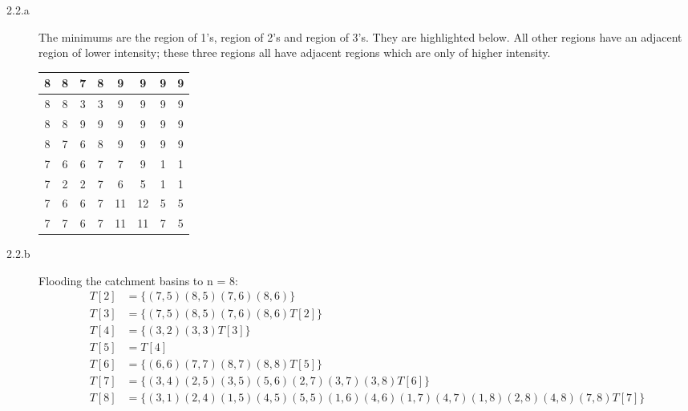\documentclass[fleqn]{article}
\begin{document}
\begin{description}
\item [2.2.a]
    The minimums are the region of 1's, region of 2's and region of 3's. They
        are highlighted below. All other regions have an adjacent region of
        lower intensity; these three regions all have adjacent regions which are
        only of higher intensity.

    \begin{tabular}{| c | c | c | c | c | c | c | c |}
        \hline
        8 & 8 & 7 & 8 & 9 & 9 & 9 & 9 \\ \hline
        8 & 8 & \cellcolor{green} 3 & \cellcolor{green} 3 & 9 & 9 & 9 & 9 \\ \hline
        8 & 8 & 9 & 9 & 9 & 9 & 9 & 9 \\ \hline
        8 & 7 & 6 & 8 & 9 & 9 & 9 & 9 \\ \hline
        7 & 6 & 6 & 7 & 7 & 9 & \cellcolor{green} 1 & \cellcolor{green} 1 \\ \hline
        7 & \cellcolor{green} 2 & \cellcolor{green} 2 & 7 & 6 & 5 & \cellcolor{green} 1 & \cellcolor{green} 1 \\ \hline
        7 & 6 & 6 & 7 & 11 & 12 & 5 & 5 \\ \hline
        7 & 7 & 6 & 7 & 11 & 11 & 7 & 5 \\
        \hline
    \end{tabular}

\item [2.2.b]
    Flooding the catchment basins to n = 8:
    \begin{align*}
        T[2] &= \{ (7,5) (8,5) (7,6) (8,6) \} \\
        T[3] &= \{ (7,5) (8,5) (7,6) (8,6) T[2] \} \\
        T[4] &= \{ (3,2) (3,3) T[3] \} \\
        T[5] &= T[4] \\
        T[6] &= \{ (6,6) (7,7) (8,7) (8,8) T[5] \} \\
        T[7] &= \{ (3,4) (2,5) (3,5) (5,6) (2,7) (3,7) (3,8) T[6] \} \\
        T[8] &= \{ (3,1) (2,4) (1,5) (4,5) (5,5) (1,6) (4,6) (1,7) (4,7) (1,8) (2,8) (4,8) (7,8) T[7] \}
    \end{align*}


\end{description}
\end{document}

